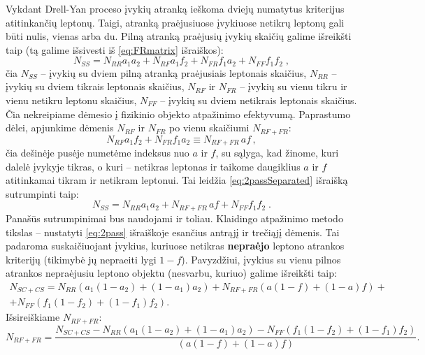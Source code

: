 \documentclass[a4paper, 12pt, oneside]{article}
\newlength\q
\begin{document}
Vykdant Drell-Yan proceso įvykių atranką ieškoma dviejų numatytus kriterijus atitinkančių leptonų.
Taigi, atranką praėjusiuose įvykiuose netikrų leptonų gali būti nulis, vienas arba du.
Pilną atranką praėjusių įvykių skaičių galime išreikšti taip (tą galime išsivesti iš \eqref{eq:FRmatrix} išraiškos):
\begin{equation}
\label{eq:2passSeparated}
	N_{SS} = N_{RR} a_1 a_2 + N_{RF} a_1f_2 + N_{FR} f_1a_2 + N_{FF} f_1 f_2 \; ,
\end{equation}
čia $N_{SS}$ -- įvykių su dviem pilną atranką praėjusiais leptonais skaičius, $N_{RR}$ -- įvykių su dviem
tikrais leptonais skaičius, $N_{RF}$ ir $N_{FR}$ -- įvykių su vienu tikru ir vienu netikru leptonu skaičius,
$N_{FF}$ -- įvykių su dviem netikrais leptonais skaičius.
Čia nekreipiame dėmesio į fizikinio objekto atpažinimo efektyvumą.
Paprastumo dėlei, apjunkime dėmenis $N_{RF}$ ir $N_{FR}$ po vienu skaičiumi $N_{RF+FR}$:
\begin{equation}
	N_{RF} a_1f_2 + N_{FR} f_1a_2 \equiv N_{RF\!+\!FR}\,af \, , 
\end{equation}
čia dešinėje pusėje numetėme indeksus nuo $a$ ir $f$, su sąlyga, kad žinome, kuri dalelė įvykyje tikras, o kuri -- netikras
leptonas ir taikome daugiklius $a$ ir $f$ atitinkamai tikram ir netikram leptonui.
Tai leidžia \eqref{eq:2passSeparated} išraišką sutrumpinti taip:
\begin{equation}
\label{eq:2pass}
	N_{SS} = N_{RR} a_1 a_2 + N_{RF\!+\!FR}\, af + N_{FF} f_1 f_2 \; .
\end{equation}
Panašūs sutrumpinimai bus naudojami ir toliau.
Klaidingo atpažinimo metodo tikslas -- nustatyti \eqref{eq:2pass} išraiškoje esančius antrąjį ir trečiąjį dėmenis.
Tai padaroma suskaičiuojant įvykius, kuriuose netikras \textbf{nepraėjo} leptono atrankos kriterijų
(tikimybė jų nepraeiti lygi $1\!-\!f$).
Pavyzdžiui, įvykius su vienu pilnos atrankos nepraėjusiu leptono objektu (nesvarbu, kuriuo) galime išreikšti taip:
\begin{equation}
	\label{eq:1fail}
	\begin{gathered}
		N_{SC\!+\!CS} = N_{RR} \left( a_1(1-a_2) + (1-a_1)a_2 \right) + N_{RF\!+\!FR} \left( a(1-f) + (1-a)f \right) + \\
			   + N_{FF} \left( f_1(1-f_2) + (1-f_1)f_2 \right).
	\end{gathered}
\end{equation}
Išsireiškiame $N_{RF\!+\!FR}$:
\begin{equation}
\label{eq:realfake}
	N_{RF\!+\!FR} = \frac{ N_{SC\!+\!CS} - N_{RR} (a_1(1-a_2)+(1-a_1)a_2) - N_{FF} (f_1(1-f_2)+(1-f_1)f_2) }
				   { (a(1-f)+(1-a)f) }.
\end{equation}
\end{document}
